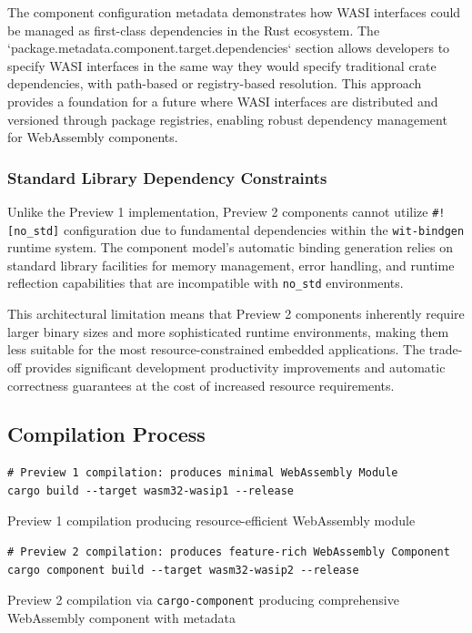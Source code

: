 The component configuration metadata demonstrates how WASI interfaces could be managed as first-class dependencies in the Rust ecosystem. The `package.metadata.component.target.dependencies` section allows developers to specify WASI interfaces in the same way they would specify traditional crate dependencies, with path-based or registry-based resolution. This approach provides a foundation for a future where WASI interfaces are distributed and versioned through package registries, enabling robust dependency management for WebAssembly components.

\subsubsection{Standard Library Dependency Constraints}

Unlike the Preview 1 implementation, Preview 2 components cannot utilize \texttt{\#![no\_std]} configuration due to fundamental dependencies within the \texttt{wit-bindgen} runtime system. The component model's automatic binding generation relies on standard library facilities for memory management, error handling, and runtime reflection capabilities that are incompatible with \texttt{no\_std} environments.

This architectural limitation means that Preview 2 components inherently require larger binary sizes and more sophisticated runtime environments, making them less suitable for the most resource-constrained embedded applications. The trade-off provides significant development productivity improvements and automatic correctness guarantees at the cost of increased resource requirements.

\subsection{Compilation Process}

\begin{listing}[H]
\begin{verbatim}
# Preview 1 compilation: produces minimal WebAssembly Module
cargo build --target wasm32-wasip1 --release
\end{verbatim}
\caption{Preview 1 compilation producing resource-efficient WebAssembly module}
\label{lst:preview1-compilation}
\end{listing}

\begin{listing}[H]
\begin{verbatim}
# Preview 2 compilation: produces feature-rich WebAssembly Component
cargo component build --target wasm32-wasip2 --release
\end{verbatim}
\caption{Preview 2 compilation via \texttt{cargo-component} producing comprehensive WebAssembly component with metadata}
\label{lst:preview2-compilation}
\end{listing}

